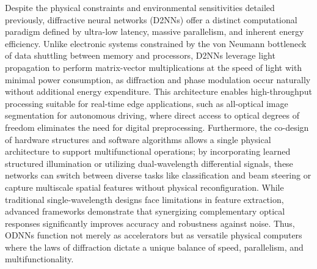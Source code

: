 Despite the physical constraints and environmental sensitivities detailed previously, diffractive neural networks (D2NNs) offer a distinct computational paradigm defined by ultra-low latency, massive parallelism, and inherent energy efficiency. Unlike electronic systems constrained by the von Neumann bottleneck of data shuttling between memory and processors, D2NNs leverage light propagation to perform matrix-vector multiplications at the speed of light with minimal power consumption, as diffraction and phase modulation occur naturally without additional energy expenditure. This architecture enables high-throughput processing suitable for real-time edge applications, such as all-optical image segmentation for autonomous driving, where direct access to optical degrees of freedom eliminates the need for digital preprocessing. Furthermore, the co-design of hardware structures and software algorithms allows a single physical architecture to support multifunctional operations; by incorporating learned structured illumination or utilizing dual-wavelength differential signals, these networks can switch between diverse tasks like classification and beam steering or capture multiscale spatial features without physical reconfiguration. While traditional single-wavelength designs face limitations in feature extraction, advanced frameworks demonstrate that synergizing complementary optical responses significantly improves accuracy and robustness against noise. Thus, ODNNs function not merely as accelerators but as versatile physical computers where the laws of diffraction dictate a unique balance of speed, parallelism, and multifunctionality. \citep{doi_10_48550_arxiv_2602_07717_16cb1c7a} \citep{doi_10_1364_prj_576203_ae347fba} \citep{doi_10_1038_s41467_022_28702_0_1b79b43c} \citep{doi_10_1002_lpor_202500433_c50e8d3b} \citep{doi_10_1364_oe_598903_731aaac1} \citep{doi_10_1364_ol_591818_8738c4b1}

